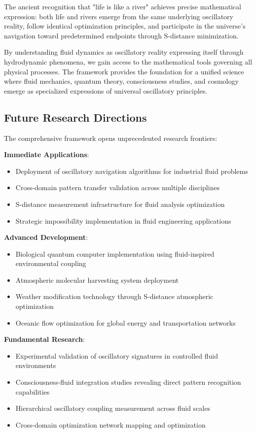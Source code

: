 \documentclass[12pt,a4paper]{article}
\begin{document}
The ancient recognition that "life is like a river" achieves precise mathematical expression: both life and rivers emerge from the same underlying oscillatory reality, follow identical optimization principles, and participate in the universe's navigation toward predetermined endpoints through S-distance minimization.

By understanding fluid dynamics as oscillatory reality expressing itself through hydrodynamic phenomena, we gain access to the mathematical tools governing all physical processes. The framework provides the foundation for a unified science where fluid mechanics, quantum theory, consciousness studies, and cosmology emerge as specialized expressions of universal oscillatory principles.

\subsection{Future Research Directions}

The comprehensive framework opens unprecedented research frontiers:

\textbf{Immediate Applications}:
\begin{itemize}
\item Deployment of oscillatory navigation algorithms for industrial fluid problems
\item Cross-domain pattern transfer validation across multiple disciplines  
\item S-distance measurement infrastructure for fluid analysis optimization
\item Strategic impossibility implementation in fluid engineering applications
\end{itemize}

\textbf{Advanced Development}:
\begin{itemize}
\item Biological quantum computer implementation using fluid-inspired environmental coupling
\item Atmospheric molecular harvesting system deployment
\item Weather modification technology through S-distance atmospheric optimization
\item Oceanic flow optimization for global energy and transportation networks
\end{itemize}

\textbf{Fundamental Research}:
\begin{itemize}
\item Experimental validation of oscillatory signatures in controlled fluid environments
\item Consciousness-fluid integration studies revealing direct pattern recognition capabilities
\item Hierarchical oscillatory coupling measurement across fluid scales
\item Cross-domain optimization network mapping and optimization
\end{itemize}
\end{document}
